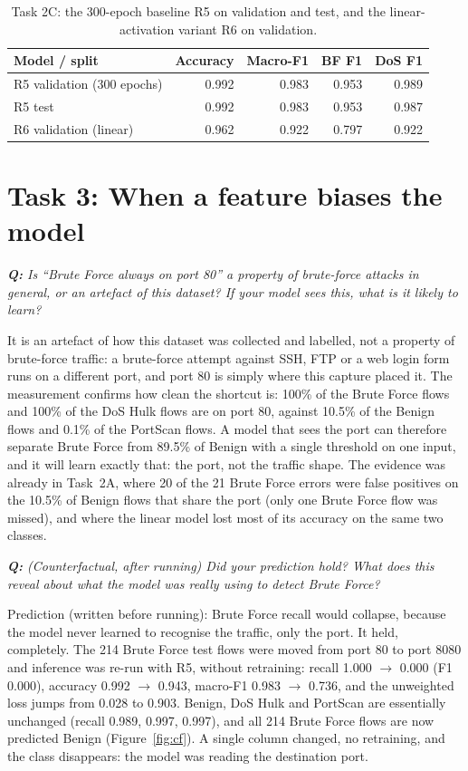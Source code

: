 \documentclass[9pt]{extarticle}
\newcommand{\qa}[1]{\par\vspace{2pt}\noindent\textit{\textbf{Q:} #1}\par\nopagebreak\noindent}
\newcommand{\run}[1]{\textsf{#1}}   %
\begin{document}
\begin{table}[htbp]
\centering\small
\caption{Task 2C: the 300-epoch baseline \run{R5} on validation and test, and the linear-activation
variant \run{R6} on validation.}
\label{tab:2c}
\begin{tabular}{@{}lrrrr@{}}
\toprule
Model / split & Accuracy & Macro-F1 & BF F1 & DoS F1 \\
\midrule
\run{R5} validation (300 epochs) & 0.992 & 0.983 & 0.953 & 0.989\\
\run{R5} test                     & 0.992 & 0.983 & 0.953 & 0.987\\
\run{R6} validation (linear)      & 0.962 & 0.922 & 0.797 & 0.922\\
\bottomrule
\end{tabular}
\end{table}

\section{Task 3: When a feature biases the model}

\qa{Is ``Brute Force always on port 80'' a property of brute-force attacks in general, or an artefact
of this dataset? If your model sees this, what is it likely to learn?}
It is an artefact of how this dataset was collected and labelled, not a property of brute-force
traffic: a brute-force attempt against SSH, FTP or a web login form runs on a different port, and
port 80 is simply where this capture placed it. The measurement confirms how clean the shortcut is:
100\% of the Brute Force flows and 100\% of the DoS Hulk flows are on port 80, against 10.5\% of the
Benign flows and 0.1\% of the PortScan flows. A model that sees the port can therefore separate
Brute Force from 89.5\% of Benign with a single threshold on one input, and it will learn exactly
that: the port, not the traffic shape. The evidence was already in Task~2A, where 20 of the 21
Brute Force errors were false positives on the 10.5\% of Benign flows that share the port (only one
Brute Force flow was missed), and where the linear model lost most of its accuracy on the same two classes.

\qa{(Counterfactual, after running) Did your prediction hold? What does this reveal about what the
model was really using to detect Brute Force?}
Prediction (written before running): Brute Force recall would collapse, because the model never
learned to recognise the traffic, only the port. It held, completely. The 214 Brute Force test
flows were moved from port 80 to port 8080 and inference was re-run with \run{R5}, without
retraining: recall
1.000 $\to$ 0.000 (F1 0.000), accuracy 0.992 $\to$ 0.943, macro-F1 0.983 $\to$ 0.736, and the
unweighted loss jumps from 0.028 to 0.903. Benign, DoS Hulk and PortScan are essentially unchanged
(recall 0.989, 0.997, 0.997), and all 214 Brute Force flows are now predicted Benign
(Figure~\ref{fig:cf}). A single column changed, no retraining, and the class disappears: the model
was reading the destination port.
\end{document}
